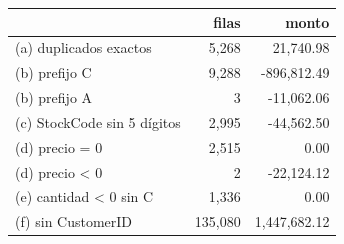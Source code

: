 \begin{tabular}{lrr}
\toprule
 & filas & monto \\
\midrule
(a) duplicados exactos & 5,268 & 21,740.98 \\
(b) prefijo C & 9,288 & -896,812.49 \\
(b) prefijo A & 3 & -11,062.06 \\
(c) StockCode sin 5 dígitos & 2,995 & -44,562.50 \\
(d) precio = 0 & 2,515 & 0.00 \\
(d) precio < 0 & 2 & -22,124.12 \\
(e) cantidad < 0 sin C & 1,336 & 0.00 \\
(f) sin CustomerID & 135,080 & 1,447,682.12 \\
\bottomrule
\end{tabular}
